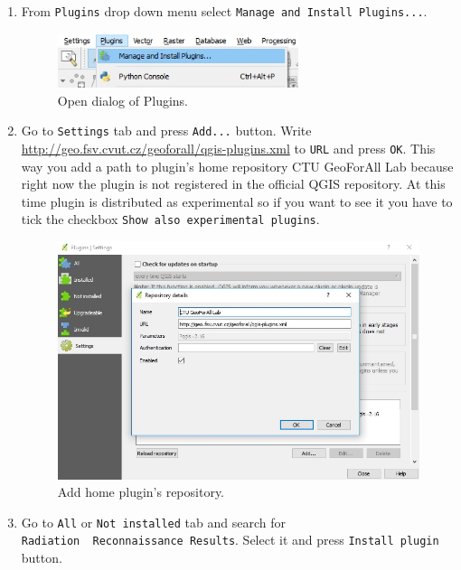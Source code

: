 \begin{enumerate}
\item{From \texttt{Plugins} drop down menu select
\texttt{Manage\ and\ Install\ Plugins...}.}

\begin{figure}[H]
    \centering
      \includegraphics[width=200pt]{./pictures/manage_install.jpg}
      \caption{Open dialog of Plugins.}
      \label{fig:manage}
\end{figure}

\item{Go to \texttt{Settings} tab and press \texttt{Add...} button. Write
\url{http://geo.fsv.cvut.cz/geoforall/qgis-plugins.xml} to \texttt{URL}
and press \texttt{OK}. This way you add a path to plugin's home
repository CTU GeoForAll Lab because right now the plugin is not
registered in the official QGIS repository. At this time plugin is
distributed as experimental so if you want to see it you have to tick
the checkbox \texttt{Show\ also\ experimental\ plugins}.}

\begin{figure}[H]
    \centering
      \includegraphics[width=400pt]{./pictures/home_repository.jpg}
      \caption{Add home plugin's repository.}
      \label{fig:repository}
\end{figure}

\item{Go to \texttt{All} or \texttt{Not\ installed} tab and search for
\texttt{Radiation\ \ Reconnaissance\ Results}. Select it and press
\texttt{Install\ plugin} button.}


\end{enumerate}
